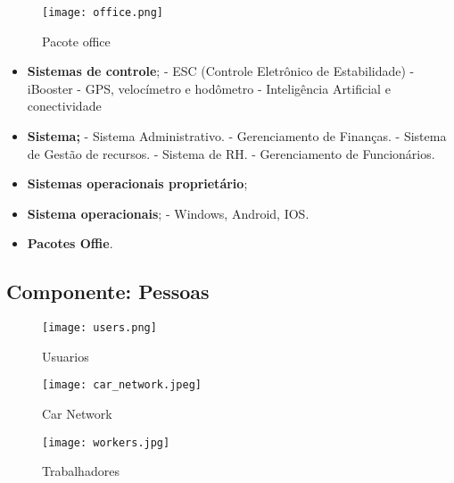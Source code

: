 \begin{figure}[H]
       \begin{center}
              \texttt{[image: office.png]}
              \caption{Pacote office} \label{sistema}
       \end{center}
\end{figure}

\begin{itemize}

       \item \textbf{Sistemas de controle};
       \subitem - ESC (Controle Eletrônico de Estabilidade)
       \subitem - iBooster
       \subitem - GPS, velocímetro e hodômetro
       \subitem - Inteligência Artificial e conectividade
       \item \textbf{Sistema;}
             \subitem - Sistema Administrativo.
             \subsubitem - Gerenciamento de Finanças.
             \subitem - Sistema de Gestão de recursos.
             \subitem - Sistema de RH.
             \subsubitem - Gerenciamento de Funcionários.


       \item \textbf{Sistemas operacionais proprietário};
       \item \textbf{Sistema operacionais};
             \subitem - Windows, Android, IOS.
       \item \textbf{Pacotes Offie}.


\end{itemize}

\subsection{Componente: Pessoas}

\begin{figure}[H]
       \begin{center}
              \texttt{[image: users.png]}
              \caption{Usuarios} \label{sistema}
       \end{center}
\end{figure}

\begin{figure}[H]
       \begin{center}
              \texttt{[image: car\_network.jpeg]}
              \caption{Car Network} \label{sistema}
       \end{center}
\end{figure}
\begin{figure}[H]
       \begin{center}
              \texttt{[image: workers.jpg]}
              \caption{Trabalhadores} \label{sistema}
       \end{center}
\end{figure}

